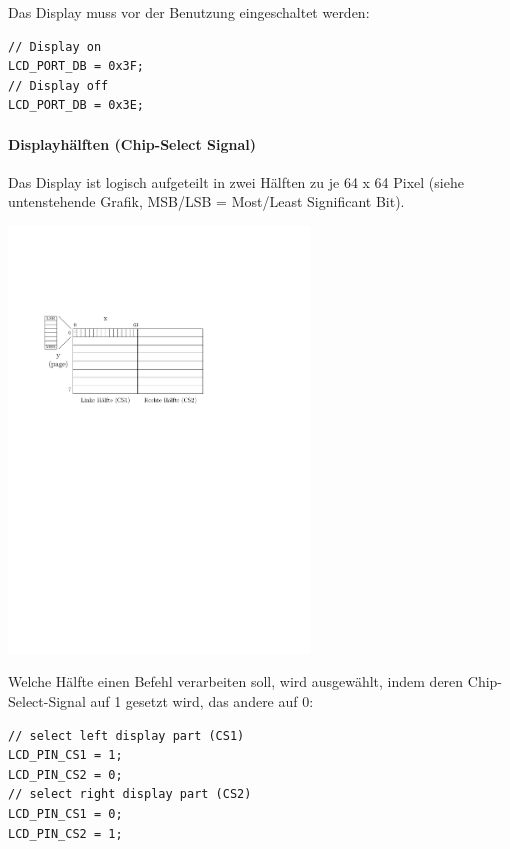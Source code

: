 Das Display muss vor der Benutzung eingeschaltet werden:
\begin{lstlisting}
// Display on
LCD_PORT_DB = 0x3F; 
// Display off
LCD_PORT_DB = 0x3E; 
\end{lstlisting}

\paragraph{Displayhälften (Chip-Select Signal)}
Das Display ist logisch aufgeteilt in zwei Hälften zu je 64 x 64 Pixel (siehe untenstehende Grafik, MSB/LSB = Most/Least Significant Bit).
\begin{center}
	\includegraphics[width=0.6\textwidth]{figures/display_aufbau}
\end{center}

Welche Hälfte einen Befehl verarbeiten soll, wird ausgewählt, indem deren Chip-Select-Signal auf 1 gesetzt wird, das andere auf 0:
\begin{lstlisting}
// select left display part (CS1)
LCD_PIN_CS1 = 1;
LCD_PIN_CS2 = 0;
// select right display part (CS2)
LCD_PIN_CS1 = 0;
LCD_PIN_CS2 = 1;
\end{lstlisting}


